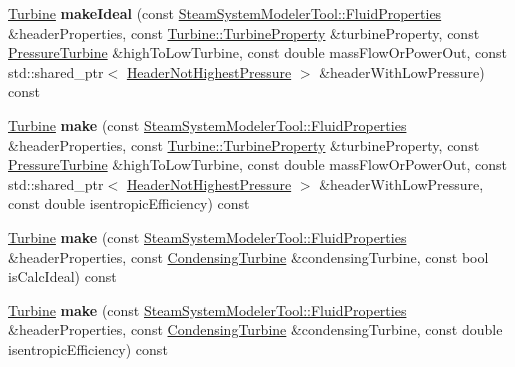 \begin{DoxyCompactItemize}
\item 
\mbox{\label{class_turbine_factory_a4b5e84997feaeccd74b4a1a52842a874}} 
\hyperlink{class_turbine}{Turbine} {\bfseries make\+Ideal} (const \hyperlink{struct_steam_system_modeler_tool_1_1_fluid_properties}{Steam\+System\+Modeler\+Tool\+::\+Fluid\+Properties} \&header\+Properties, const \hyperlink{class_turbine_a5db4f65cf2539e3837684d53221ade12}{Turbine\+::\+Turbine\+Property} \&turbine\+Property, const \hyperlink{class_pressure_turbine}{Pressure\+Turbine} \&high\+To\+Low\+Turbine, const double mass\+Flow\+Or\+Power\+Out, const std\+::shared\+\_\+ptr$<$ \hyperlink{class_header_not_highest_pressure}{Header\+Not\+Highest\+Pressure} $>$ \&header\+With\+Low\+Pressure) const
\item 
\mbox{\label{class_turbine_factory_ab14f6bfd1b6202e9cf45d9d023f78f77}} 
\hyperlink{class_turbine}{Turbine} {\bfseries make} (const \hyperlink{struct_steam_system_modeler_tool_1_1_fluid_properties}{Steam\+System\+Modeler\+Tool\+::\+Fluid\+Properties} \&header\+Properties, const \hyperlink{class_turbine_a5db4f65cf2539e3837684d53221ade12}{Turbine\+::\+Turbine\+Property} \&turbine\+Property, const \hyperlink{class_pressure_turbine}{Pressure\+Turbine} \&high\+To\+Low\+Turbine, const double mass\+Flow\+Or\+Power\+Out, const std\+::shared\+\_\+ptr$<$ \hyperlink{class_header_not_highest_pressure}{Header\+Not\+Highest\+Pressure} $>$ \&header\+With\+Low\+Pressure, const double isentropic\+Efficiency) const
\item 
\mbox{\label{class_turbine_factory_a7a7ed3809be731fa9768fbed3f03f869}} 
\hyperlink{class_turbine}{Turbine} {\bfseries make} (const \hyperlink{struct_steam_system_modeler_tool_1_1_fluid_properties}{Steam\+System\+Modeler\+Tool\+::\+Fluid\+Properties} \&header\+Properties, const \hyperlink{class_condensing_turbine}{Condensing\+Turbine} \&condensing\+Turbine, const bool is\+Calc\+Ideal) const
\item 
\mbox{\label{class_turbine_factory_abfdd2414b20185135168f89ec0bccc9f}} 
\hyperlink{class_turbine}{Turbine} {\bfseries make} (const \hyperlink{struct_steam_system_modeler_tool_1_1_fluid_properties}{Steam\+System\+Modeler\+Tool\+::\+Fluid\+Properties} \&header\+Properties, const \hyperlink{class_condensing_turbine}{Condensing\+Turbine} \&condensing\+Turbine, const double isentropic\+Efficiency) const

\end{DoxyCompactItemize}
